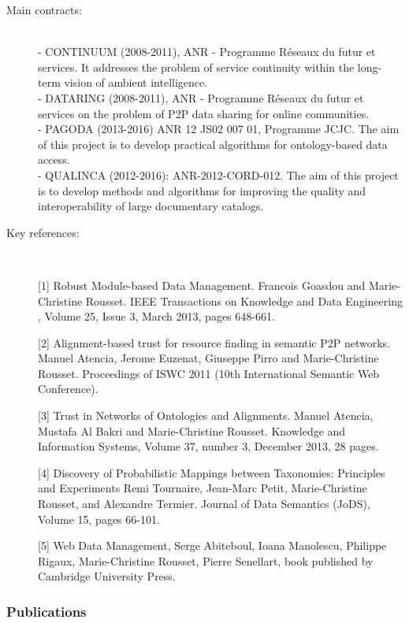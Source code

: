 \begin{description}
\item[Main contracts:] \ \\
- CONTINUUM (2008-2011), ANR - Programme R{\'e}seaux du futur et services.  It addresses the problem of service continuity within the long-term vision of ambient intelligence. \\
- DATARING (2008-2011), ANR - Programme R{\'e}seaux du futur et services on the problem of P2P data sharing for online communities. \\
- PAGODA (2013-2016)  ANR 12 JS02 007 01, Programme JCJC. The aim of this project is to develop practical algorithms for ontology-based data access. \\
- QUALINCA (2012-2016): ANR-2012-CORD-012. The aim of this project is to develop methods and algorithms for improving the quality and interoperability of large documentary catalogs. 
  
\item[Key references:]~%

[1] Robust Module-based Data Management. Francois Goasdou and Marie-Christine Rousset. IEEE Transactions on Knowledge and Data Engineering , Volume 25, Issue 3, March 2013, pages 648-661. 

[2] Alignment-based trust for resource finding in semantic P2P networks. Manuel Atencia, Jerome Euzenat, Giuseppe Pirro and Marie-Christine Rousset. Proceedings of ISWC 2011 (10th International Semantic Web Conference). 

[3] Trust in Networks of Ontologies and Alignments. Manuel Atencia, Mustafa Al Bakri and Marie-Christine Rousset.  Knowledge and Information Systems, Volume 37, number 3, December 2013, 28 pages. 

[4] Discovery of Probabilistic Mappings between Taxonomies: Principles and Experiments Remi Tournaire, Jean-Marc Petit, Marie-Christine Rousset, and Alexandre Termier. Journal of Data Semantics (JoDS), Volume 15, pages 66-101. 

[5] Web Data Management, Serge Abiteboul, Ioana Manolescu, Philippe Rigaux, Marie-Christine Rousset, Pierre Senellart, book published by Cambridge University Press. 

\end{description}

\subsubsection{Publications} %


